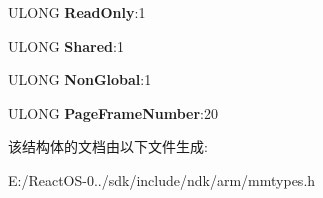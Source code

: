 \begin{DoxyCompactItemize}
\item 
\mbox{\label{struct___h_a_r_d_w_a_r_e___p_t_e___a_r_m_v6_adca223c5455d935c45a96ca4678f40bb}} 
U\+L\+O\+NG {\bfseries Read\+Only}\+:1
\item 
\mbox{\label{struct___h_a_r_d_w_a_r_e___p_t_e___a_r_m_v6_a875022041cc8d13bebb0f14b6e18b07d}} 
U\+L\+O\+NG {\bfseries Shared}\+:1
\item 
\mbox{\label{struct___h_a_r_d_w_a_r_e___p_t_e___a_r_m_v6_ae39cc3a4c25ccf2ada9c2a2296b7317c}} 
U\+L\+O\+NG {\bfseries Non\+Global}\+:1
\item 
\mbox{\label{struct___h_a_r_d_w_a_r_e___p_t_e___a_r_m_v6_a9944eabb53fa27c9ba736187f217dab6}} 
U\+L\+O\+NG {\bfseries Page\+Frame\+Number}\+:20
\end{DoxyCompactItemize}


该结构体的文档由以下文件生成\+:\begin{DoxyCompactItemize}
\item 
E\+:/\+React\+O\+S-\/0../sdk/include/ndk/arm/mmtypes.\+h\end{DoxyCompactItemize}
